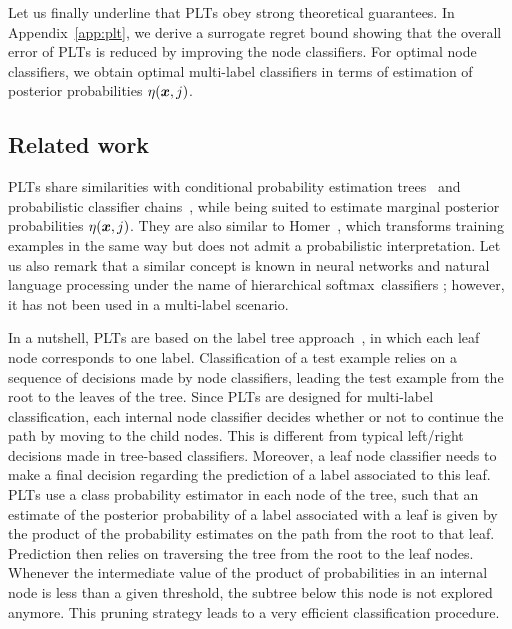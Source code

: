 \documentclass{article}
\newcommand{\Algo}[1]{\textsc{#1}}
\newcommand{\sectionBefore}{-0pt}
\newcommand{\sectionAfter}{-0pt}
\begin{document}
Let us finally underline that  \Algo{PLT}s obey strong theoretical guarantees. In  Appendix~\ref{app:plt}, we derive a surrogate regret bound showing that the overall error of \Algo{PLT}s is reduced by improving the node classifiers. For optimal node classifiers, we obtain optimal multi-label classifiers in terms of estimation of posterior probabilities $\eta(\boldsymbol{x},j)$.



\vspace{\sectionBefore}
\subsection{Related work}
\vspace{\sectionAfter}

\Algo{PLT}s share similarities with conditional probability estimation trees~\cite{Beygelzimer_et_al_2009b} and probabilistic classifier chains~\cite{Dembczynski_et_al_2010c}, while being suited to estimate marginal posterior probabilities $\eta(\boldsymbol{x},j)$. They are also similar to Homer~\cite{Tsoumakas_et_al_2008}, which transforms training examples in the same way but does not admit a probabilistic interpretation. Let us also remark that a similar concept is known in neural networks and natural language processing under the name of hierarchical softmax~classifiers \cite{Morin_Bengio_2005}; however, it has not been used in a multi-label scenario.

In a nutshell, \Algo{PLT}s are based on the label tree approach~\cite{Beygelzimer_et_al_2009a,Bengio_et_al_2010,Deng_et_al_2011}, in which each leaf node corresponds to one label. Classification of a test example relies on a sequence of decisions made by node classifiers, leading the test example from the root to the leaves of the tree. Since \Algo{PLT}s are designed for multi-label classification, each internal node classifier decides whether or not to continue the path by moving to the child nodes. This is different from typical left/right decisions made in tree-based classifiers.  Moreover, a leaf node classifier needs to make a final decision regarding the prediction of a label associated to this leaf. \Algo{PLT}s use a class probability estimator in each node of the tree, such that an estimate of the posterior probability of a label associated with a leaf is given by the product of the probability estimates on the path from the root to that leaf. Prediction then relies on traversing the tree from the root to the leaf nodes. Whenever the intermediate value of the product of probabilities in an internal node is less than a given threshold, the subtree below this node is not explored anymore. This pruning strategy leads to a very efficient classification procedure. %
\end{document}
